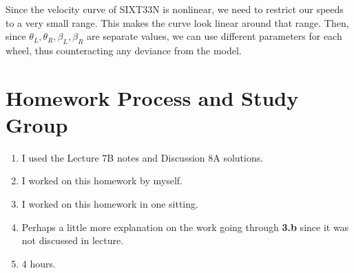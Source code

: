 \documentclass[]{article}
\begin{document}
Since the velocity curve of SIXT33N is nonlinear, we need to restrict our speeds to a very small range.
This makes the curve look linear around that range.
Then, since \(\theta_L, \theta_R, \beta_L, \beta_R\) are separate values, we can use different parameters for each wheel, thus counteracting any deviance from the model.


\section{Homework Process and Study Group}

\begin{enumerate}
	\item I used the Lecture 7B notes and Discussion 8A solutions.
	\item I worked on this homework by myself.
	\item I worked on this homework in one sitting.
	\item Perhaps a little more explanation on the work going through \textbf{3.b} since it was not discussed in lecture.
	\item 4 hours.
\end{enumerate}

\newpage

%
\end{document}
